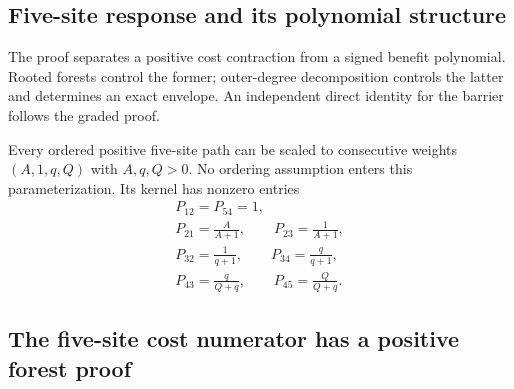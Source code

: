\documentclass[aps,pre,reprint,amsmath,amssymb,longbibliography]{revtex4-2}
\begin{document}
\subsection{Five-site response and its polynomial structure}
\label{app:path-p5-global}\label{app:path-five}

The proof separates a positive cost contraction from a signed benefit
polynomial. Rooted forests control the former; outer-degree decomposition
controls the latter and determines an exact envelope. An independent
direct identity for the barrier follows the graded proof.

Every ordered positive five-site path can be scaled to consecutive
weights $(A,1,q,Q)$ with $A,q,Q>0$. No ordering assumption enters this
parameterization. Its kernel has nonzero entries
\begin{equation}
 \begin{gathered}
 P_{12}=P_{54}=1,\\
 P_{21}=\frac{A}{A+1},\qquad P_{23}=\frac{1}{A+1},\\
 P_{32}=\frac{1}{q+1},\qquad P_{34}=\frac{q}{q+1},\\
 P_{43}=\frac{q}{Q+q},\qquad P_{45}=\frac{Q}{Q+q}.
 \end{gathered}
 \label{app:path-p5-kernel}
\end{equation}
\subsection{The five-site cost numerator has a positive forest proof}
\label{v4:alg:p5-forest}
\end{document}
